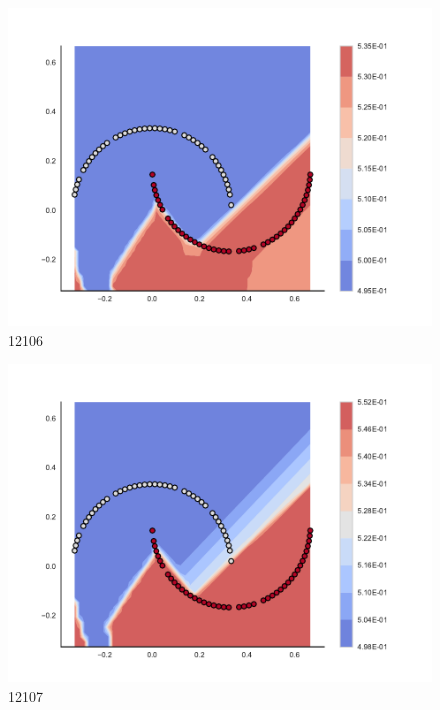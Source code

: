 \begin{subfigure}[b]{0.09\textwidth}
    \includegraphics[clip, trim=2.35cm 1.75cm 4.5cm 0cm,width=\textwidth]{img/convergence/12106.pdf}
    \caption{12106}
    \label{fig:convergence_12106}
\end{subfigure}
%
\begin{subfigure}[b]{0.09\textwidth}
    \includegraphics[clip, trim=2.35cm 1.75cm 4.5cm 0cm,width=\textwidth]{img/convergence/12107.pdf}
    \caption{12107}
    \label{fig:convergence_12107}
\end{subfigure}
%
